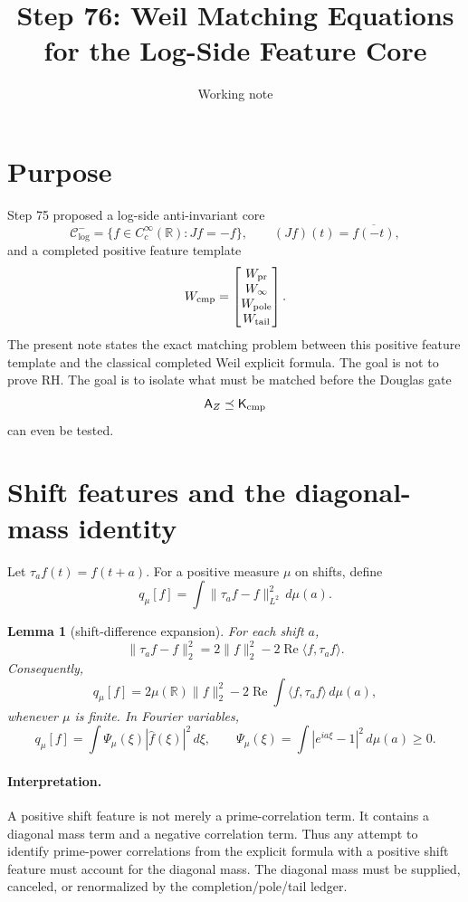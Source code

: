 \documentclass[11pt]{article}
\title{Step 76: Weil Matching Equations for the Log-Side Feature Core}
\author{Working note}
\date{}
\newtheorem{lemma}{Lemma}
\newcommand{\Kcmp}{\mathsf K_{\rm cmp}}
\newcommand{\AZ}{\mathsf A_Z}
\newcommand{\Ccore}{\mathcal C^-_{\log}}
\begin{document}
\maketitle

\section{Purpose}
Step 75 proposed a log-side anti-invariant core
\[
  \Ccore=\{f\in C_c^\infty(\mathbb R): Jf=-f\},\qquad (Jf)(t)=\overline{f(-t)},
\]
and a completed positive feature template
\[
  W_{\rm cmp}=\begin{bmatrix}W_{\rm pr}\\ W_\infty\\ W_{\rm pole}\\ W_{\rm tail}\end{bmatrix}.
\]
The present note states the exact matching problem between this positive feature template and the classical completed Weil explicit formula.  The goal is not to prove RH.  The goal is to isolate what must be matched before the Douglas gate
\[
  \AZ\preceq\Kcmp
\]
can even be tested.

\section{Shift features and the diagonal-mass identity}
Let \(\tau_a f(t)=f(t+a)\).  For a positive measure \(\mu\) on shifts, define
\[
  q_\mu[f]=\int \|\tau_a f-f\|_{L^2}^2\,d\mu(a).
\]

\begin{lemma}[shift-difference expansion]
For each shift \(a\),
\[
  \|\tau_a f-f\|_2^2
  =2\|f\|_2^2-2\operatorname{Re}\langle f,\tau_a f\rangle.
\]
Consequently,
\[
  q_\mu[f]=2\mu(\mathbb R)\|f\|_2^2-2\operatorname{Re}\int \langle f,\tau_a f\rangle\,d\mu(a),
\]
whenever \(\mu\) is finite.  In Fourier variables,
\[
  q_\mu[f]=\int \Psi_\mu(\xi)|\widehat f(\xi)|^2\,d\xi,
  \qquad
  \Psi_\mu(\xi)=\int |e^{ia\xi}-1|^2\,d\mu(a)\ge0.
\]
\end{lemma}

\paragraph{Interpretation.}
A positive shift feature is not merely a prime-correlation term.  It contains a diagonal mass term and a negative correlation term.  Thus any attempt to identify prime-power correlations from the explicit formula with a positive shift feature must account for the diagonal mass.  The diagonal mass must be supplied, canceled, or renormalized by the completion/pole/tail ledger.
\end{document}
